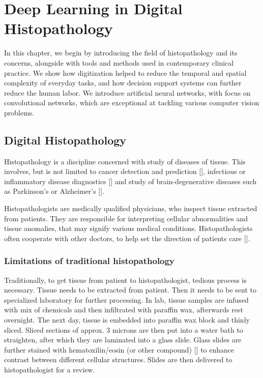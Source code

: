 \chapter{Deep Learning in Digital Histopathology}

In this chapter, we begin by introducing the field of histopathology and its concerns, alongside with tools and methods used in contemporary clinical practice. We show how digitization helped to reduce the temporal and spatial complexity of everyday tasks, and how decision support systems can further reduce the human labor. We introduce artificial neural networks, with focus on convolutional networks, which are exceptional at tackling various computer vision problems.

\section{Digital Histopathology}

Histopathology is a discipline concerned with study of diseases of tissue. This involves, but is not limited to cancer detection and prediction [], infectious or inflammatory disease diagnostics [] and study of brain-degenerative diseases such as Parkinson's or Alzheimer's [].

Histopathologists are medically qualified physicians, who inspect tissue extracted from patients. They are responsible for interpreting cellular abnormalities and tissue anomalies, that may signify various medical conditions. Histopathologists often cooperate with other doctors, to help set the direction of patients care [].

\subsection{Limitations of traditional histopathology}

Traditionally, to get tissue from patient to histopathologist, tedious process is necessary. Tissue needs to be extracted from patient. Then it needs to be sent to specialized laboratory for further processing. In lab, tissue samples are infused with mix of chemicals and then infiltrated with paraffin wax, afterwards rest overnight. The next day, tissue is embedded into paraffin wax block and thinly sliced. Sliced sections of approx. $3$ microns are then put into a water bath to straighten, after which they are laminated into a glass slide. Glass slides are further stained with hematoxilin/eosin (or other compound) [] to enhance contrast between different cellular structures. Slides are then delivered to histopathologist for a review.

